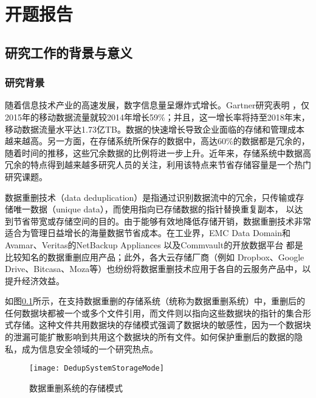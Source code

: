 \chapter*{开题报告}

\setcounter{chapter}{1}

\section{研究工作的背景与意义}
\subsection{研究背景}

随着信息技术产业的高速发展，数字信息量呈爆炸式增长。Gartner研究表明 ，仅2015年的移动数据流量就较2014年增长59\%；并且，这一增长率将持至2018年末，移动数据流量水平达1.73亿TB。数据的快速增长导致企业面临的存储和管理成本越来越高。另一方面，在存储系统所保存的数据中，高达60\%的数据都是冗余的，随着时间的推移，这些冗余数据的比例将进一步上升。近年来，存储系统中数据高冗余的特点得到越来越多研究人员的关注，利用该特点来节省存储容量是一个热门研究课题。

数据重删技术（data deduplication）是指通过识别数据流中的冗余，只传输或存储唯一数据（unique data），而使用指向已存储数据的指针替换重复副本， 以达到节省带宽或存储空间的目的。由于能够有效地降低存储开销，数据重删技术非常适合为管理日益增长的海量数据节省成本。在工业界，EMC Data Domain和Avamar、Veritas的NetBackup Appliances 以及Commvault的开放数据平台 都是比较知名的数据重删应用产品；此外，各大云存储厂商（例如 Dropbox、Google Drive、Bitcasa、Moza等）也纷纷将数据重删技术应用于各自的云服务产品中，以提升经济效益。

如图\ref{fig:数据重删系统的存储模式}所示，在支持数据重删的存储系统（统称为数据重删系统）中，重删后的任何数据块都被一个或多个文件引用，而文件则以指向这些数据块的指针的集合形式存储。这种文件共用数据块的存储模式强调了数据块的敏感性，因为一个数据块的泄漏可能扩散影响到共用这个数据块的所有文件。如何保护重删后的数据的隐私，成为信息安全领域的一个研究热点。

\begin{figure}[!htb]
    \small
    \centering
    \texttt{[image: DedupSystemStorageMode]}
    \caption{数据重删系统的存储模式} 
    \label{fig:数据重删系统的存储模式}
\end{figure}

